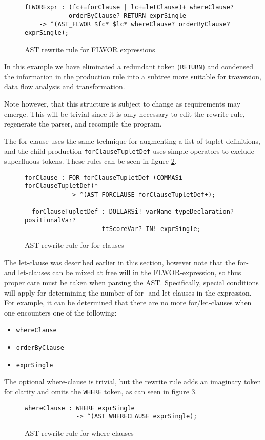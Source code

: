 \begin{figure}[h]
\begin{verbatim}
fLWORExpr : (fc+=forClause | lc+=letClause)+ whereClause?
            orderByClause? RETURN exprSingle
    -> ^(AST_FLWOR $fc* $lc* whereClause? orderByClause? exprSingle);
\end{verbatim}
\caption{AST rewrite rule for FLWOR expressions}
\label{code:ast:flwor}
\end{figure}

In this example we have eliminated a redundant token (\verb!RETURN!) and
condensed the information in the production rule into a subtree more suitable
for traversion, data flow analysis and transformation.

Note however, that this structure is subject to change as requirements may 
emerge. This will be trivial since it is only necessary to edit the rewrite
rule, regenerate the parser, and recompile the program.

The for-clause uses the same technique for augmenting a list of tuplet
definitions, and the child production \verb!forClauseTupletDef! uses simple
operators to exclude superfluous tokens. These rules can be seen in figure
\ref{code:ast:forclause}. 

\begin{figure}[h]
\begin{verbatim} 
forClause : FOR forClauseTupletDef (COMMASi forClauseTupletDef)* 
            -> ^(AST_FORCLAUSE forClauseTupletDef+);

  forClauseTupletDef : DOLLARSi! varName typeDeclaration? positionalVar? 
                     ftScoreVar? IN! exprSingle;
\end{verbatim}
\caption{AST rewrite rule for for-clauses}
\label{code:ast:forclause}
\end{figure}

The let-clause was described earlier in this section, however note that the for-
and let-clauses can be mixed at free will in the FLWOR-expression, so thus
proper care must be taken when parsing the AST. Specifically, special conditions
will apply for determining the number of for- and let-clauses in the expression.
For example, it can be determined that there are no more for/let-clauses when
one encounters one of the following:
\begin{itemize}
  \item \verb!whereClause!
  \item \verb!orderByClause!
  \item \verb!exprSingle!
\end{itemize}

The optional where-clause is trivial, but the rewrite rule adds an imaginary
token for clarity and omits the \verb!WHERE! token, as can seen in figure
\ref{code:ast:whereclause}.

\begin{figure}[h]
\begin{verbatim} 
whereClause : WHERE exprSingle
              -> ^(AST_WHERECLAUSE exprSingle);
\end{verbatim}
\caption{AST rewrite rule for where-clauses}
\label{code:ast:whereclause}
\end{figure}
                                                